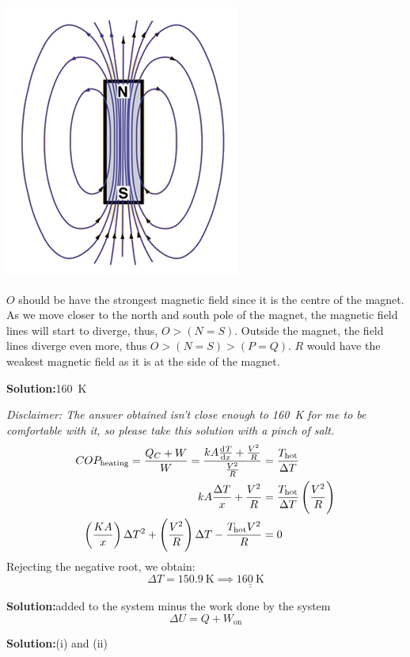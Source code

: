 \documentclass[11pt]{article}
\newcommand*\circled[1]{\tikz[baseline=(char.base)]{
		\node[shape=circle,draw,inner sep=2pt] (char) {#1};}}
\def\doubleunderline#1{\underline{\underline{#1}}}
\newcommand{\solution}[2]{\textbf{Solution:\hspace{1em}\circled{#1}}\hspace{1em}#2\hspace{1em}}
\newlength{\currentparskip}
\begin{document}
\begin{enumerate}[label={[Q\arabic*]},itemsep={1em}]
			\begin{minipage}[c]{2.5cm}
				\includegraphics{46.png}
			\end{minipage}%
			\setlength{\currentparskip}{\parskip}		%
			\begin{minipage}{\textwidth - 3.6cm}
				\setlength{\parskip}{\currentparskip}	%
				\noindent
				$O$ should be have the strongest magnetic field since it is the centre of the magnet. As we move closer to the north and south pole of the magnet, the magnetic field lines will start to diverge, thus, $O > \left(N = S\right)$. Outside the magnet, the field lines diverge even more, thus $O > \left(N = S\right) > \left(P = Q\right)$. $R$ would have the weakest magnetic field as it is at the side of the magnet.
			\end{minipage}
		\item \solution{E}{\SI{160}{\kelvin}}
		
			\textit{Disclaimer: The answer obtained isn't close enough to \SI{160}{\kelvin} for me to be comfortable with it, so please take this solution with a pinch of salt.}
			\begin{align*}
				COP_{\text{heating}} = \frac{Q_C + W}{W} = \frac{kA \od{T}{x} + \frac{V^2}{R}}{\frac{V^2}{R}} &= \frac{T_\text{hot}}{\Delta T} \\
				kA \frac{\Delta T}{x} + \frac{V^2}{R} &= \frac{T_\text{hot}}{\Delta T} \left(\frac{V^2}{R}\right) \\
				\left(\frac{KA}{x}\right) \Delta T^2 + \left(\frac{V^2}{R}\right) \Delta T - \frac{T_\text{hot}V^2}{R} &= 0
			\end{align*}
			Rejecting the negative root, we obtain:
			\begin{equation*}
				\Delta T = \SI{150.9}{\kelvin} \implies \doubleunderline{\SI{160}{\kelvin}}
			\end{equation*}
		\item \solution{A}{added to the system minus the work done by the system}
			\begin{equation}
				\Delta U = Q + W_\text{on}
			\end{equation}
		\item \solution{E}{(i) and (ii)}
		

\end{enumerate}
\end{document}
